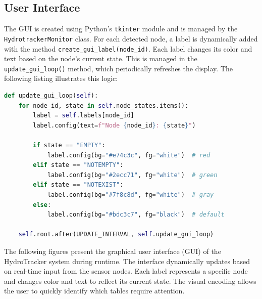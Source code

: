 \subsection{User Interface}
The GUI is created using Python's \texttt{tkinter} module and is managed by the \texttt{HydrotrackerMonitor} class. For each detected node, a label is dynamically added with the method \texttt{create\_gui\_label(node\_id)}. Each label changes its color and text based on the node's current state. This is managed in the \texttt{update\_gui\_loop()} method, which periodically refreshes the display.
The following listing illustrates this logic:

\begin{lstlisting}[language=Python, caption={GUI update and label coloring based on node state}]
def update_gui_loop(self):
    for node_id, state in self.node_states.items():
        label = self.labels[node_id]
        label.config(text=f"Node {node_id}: {state}") 

        if state == "EMPTY":
            label.config(bg="#e74c3c", fg="white")  # red
        elif state == "NOTEMPTY":
            label.config(bg="#2ecc71", fg="white")  # green
        elif state == "NOTEXIST":
            label.config(bg="#7f8c8d", fg="white")  # gray
        else:
            label.config(bg="#bdc3c7", fg="black")  # default

    self.root.after(UPDATE_INTERVAL, self.update_gui_loop)
\end{lstlisting}

The following figures present the graphical user interface (GUI) of the HydroTracker system during runtime. The interface dynamically updates based on real-time input from the sensor nodes. Each label represents a specific node and changes color and text to reflect its current state. The visual encoding allows the user to quickly identify which tables require attention.


